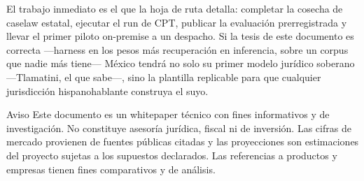 El trabajo inmediato es el que la hoja de ruta detalla: completar la cosecha de caselaw estatal, ejecutar el run de CPT, publicar la evaluación prerregistrada y llevar el primer piloto on-premise a un despacho. Si la tesis de este documento es correcta ---harness en los pesos más recuperación en inferencia, sobre un corpus que nadie más tiene--- México tendrá no solo su primer modelo jurídico soberano ---Tlamatini, el que sabe---, sino la plantilla replicable para que cualquier jurisdicción hispanohablante construya el suyo.

\vspace{1em}
\begin{alerta}{Aviso}
Este documento es un whitepaper técnico con fines informativos y de investigación. No constituye asesoría jurídica, fiscal ni de inversión. Las cifras de mercado provienen de fuentes públicas citadas y las proyecciones son estimaciones del proyecto sujetas a los supuestos declarados. Las referencias a productos y empresas tienen fines comparativos y de análisis.
\end{alerta}
